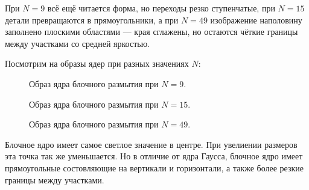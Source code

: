 \documentclass[a4paper]{article}
\begin{document}
\noindent При $N=9$ всё ещё читается форма, но переходы резко ступенчатые, при $N=15$ детали превращаются в прямоугольники, а при $N=49$ изображение наполовину заполнено плоскими областями — края сглажены, но остаются чёткие границы между участками со средней яркостью.

Посмотрим на образы ядер при разных значениях $N$:

\begin{figure}[H]
  \centering
  
  \caption{Образ ядра блочного размытия при $N=9$.}
\end{figure}
\begin{figure}[H]
  \centering
  
  \caption{Образ ядра блочного размытия при $N=15$.}
\end{figure}
\begin{figure}[H]
  \centering
  
  \caption{Образ ядра блочного размытия при $N=49$.}
\end{figure}

\noindent Блочное ядро имеет самое светлое значение в центре. При увелиении размеров эта точка так же уменьшается. Но в отличие от ядра Гаусса, блочное ядро имеет прямоугольные состовляющие на вертикали и горизонтали, а также более резкие границы между участками.
\end{document}
